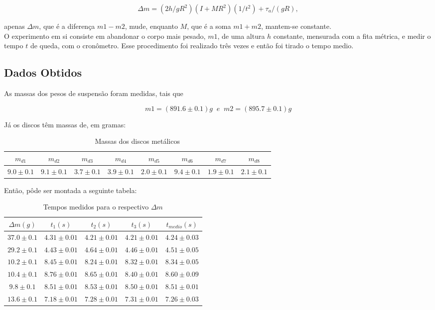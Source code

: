 \documentclass[12pt,a4paper]{article}
\begin{document}
$$\Delta m = (2h/gR^2)(I + MR^2)(1/t^2) + \tau_a/(gR),$$

apenas $\Delta m$, que é a diferença $m1 - m2$, mude, enquanto $M$, que é a soma $m1 + m2$, mantem-se constante.\\

O experimento em si consiste em abandonar o corpo mais pesado, $m1$, de uma altura $h$ constante, mensurada com a fita métrica, e medir o tempo $t$ de queda, com o cronômetro. Esse procedimento foi realizado três vezes e então foi tirado o tempo medio.

\subsection{Dados Obtidos}
As massas dos pesos de suspensão foram medidas, tais que

$$m1 = (891.6 \pm 0.1)g \;\; e \;\; m2 = (895.7 \pm 0.1)g$$

Já os discos têm massas de, em gramas:

\begin{table}[!htbp]
\centering
\caption{Massas dos discos metálicos}
\begin{tabular}{|c|c|c|c|c|c|c|c|}
\hline 
$m_{d1}$ & $m_{d2}$ & $m_{d3}$ & $m_{d4}$ & $m_{d5}$ & $m_{d6}$ & $m_{d7}$ & $m_{d8}$\\ 
\hline 
$9.0 \pm 0.1$ & $9.1 \pm 0.1$ & $3.7 \pm 0.1$ & $3.9 \pm 0.1$ & $2.0 \pm 0.1$ & $9.4 \pm 0.1$ & $1.9 \pm 0.1$ & $2.1 \pm 0.1$\\ 
\hline
\end{tabular} 
\label{MassaDiscos}
\end{table}

Então, pôde ser montada a seguinte tabela:

\newpage

\begin{table}[!htbp]
\centering
\caption{Tempos medidos para o respectivo $\Delta m$}
\begin{tabular}{|c|c|c|c|c|}

\hline 
$\Delta m (g)$ & $t_1 (s)$ & $t_2 (s)$ & $t_3 (s)$ & $t_{medio} (s)$ \\ 
\hline 
$37.0 \pm 0.1$ & $4.31 \pm 0.01$ & $4.21 \pm 0.01$ & $4.21 \pm 0.01$ & $4.24 \pm 0.03$ \\ 
\hline 
$29.2 \pm 0.1$ & $4.43 \pm 0.01$ & $4.64 \pm 0.01$ & $4.46 \pm 0.01$ & $4.51 \pm 0.05$ \\ 
\hline 
$10.2 \pm 0.1$ & $8.45 \pm 0.01$ & $8.24 \pm 0.01$ & $8.32 \pm 0.01$ & $8.34 \pm 0.05$ \\ 
\hline 
$10.4 \pm 0.1$ & $8.76 \pm 0.01$ & $8.65 \pm 0.01$ & $8.40 \pm 0.01$ & $8.60 \pm 0.09$ \\ 
\hline 
$9.8 \pm 0.1$ & $8.51 \pm 0.01$ & $8.53 \pm 0.01$ & $8.50 \pm 0.01$ & $8.51 \pm 0.01$ \\ 
\hline 
$13.6 \pm 0.1$ & $7.18 \pm 0.01$ & $7.28 \pm 0.01$ & $7.31 \pm 0.01$ & $7.26 \pm 0.03$ \\ 
\hline 

\end{tabular} 
\label{Tempos}
\end{table}
\end{document}
